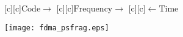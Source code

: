 \documentclass{article}
\begin{document}
\begin{figure}[htb]
  \begin{center}

        [c][c]{\hspace{4mm}$\mathrm{Code}\rightarrow$}
        [c][c]{\hspace{7mm}$\mathrm{Frequency}\rightarrow$}
        [c][c]{$\leftarrow\mathrm{Time}$}

    \texttt{[image: fdma\_psfrag.eps]}
    \end{center}
\end{figure}
\end{document}
